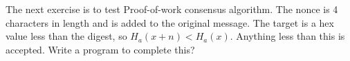 The next exercise is to test Proof-of-work consensus algorithm. The nonce is 4 characters in length and is added to the original message. The target is a hex value less than the digest, so $H_{a}(x+n)<H_{a}(x)$. Anything less than this is accepted. Write a program to complete this?


%
%
%
%			
%
%
%


